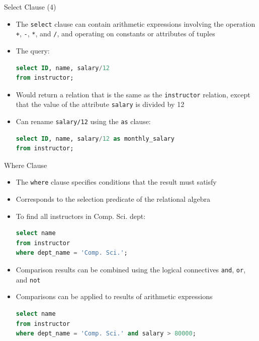 \documentclass[aspectratio=169, xcolor=dvipsnames]{beamer}
\begin{document}
\begin{frame}[fragile]{Select Clause (4)}
    \begin{itemize}[<+->]
        \item The \texttt{select} clause can contain arithmetic expressions involving the operation \texttt{+}, \texttt{-}, \texttt{*}, and \texttt{/}, and operating on constants or attributes of tuples
        \item The query:
        \begin{lstlisting}[language=SQL]
select ID, name, salary/12
from instructor;
        \end{lstlisting}
        \item Would return a relation that is the same as the \texttt{instructor} relation, except that the value of the attribute \texttt{salary} is divided by 12
        \item Can rename \texttt{salary/12} using the \texttt{as} clause:
        \begin{lstlisting}[language=SQL]
select ID, name, salary/12 as monthly_salary
from instructor;
        \end{lstlisting}
    \end{itemize}
\end{frame}

\begin{frame}[fragile]{Where Clause}
    \begin{itemize}[<+->]
        \item The \texttt{where} clause specifies conditions that the result must satisfy
        \item Corresponds to the selection predicate of the relational algebra
        \item To find all instructors in Comp. Sci. dept:
        \begin{lstlisting}[language=SQL]
select name
from instructor
where dept_name = 'Comp. Sci.';
        \end{lstlisting}
        \item Comparison results can be combined using the logical connectives \texttt{and}, \texttt{or}, and \texttt{not}
        \item Comparisons can be applied to results of arithmetic expressions
        \begin{lstlisting}[language=SQL]
select name
from instructor
where dept_name = 'Comp. Sci.' and salary > 80000;
        \end{lstlisting}
    \end{itemize}
\end{frame}
\end{document}
